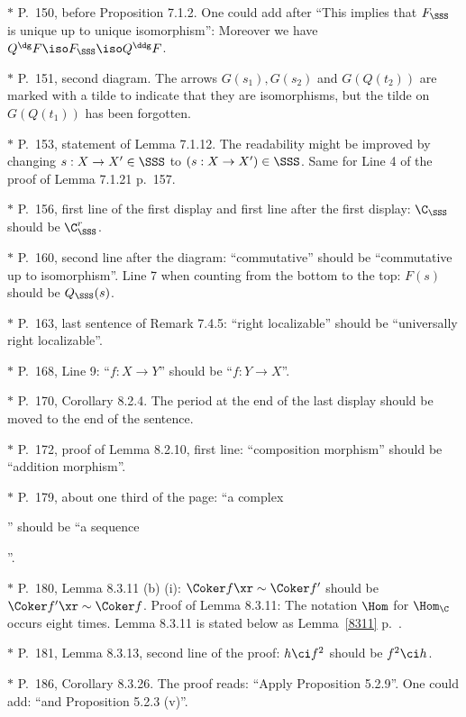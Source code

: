 \documentclass[12pt]{article}
\theoremstyle{remark}
\theoremstyle{definition}
\begin{document}
\nn$*$ P.~150, before Proposition 7.1.2. One could add after ``This implies that $F_{\SSS}$ is unique up to unique isomorphism'': Moreover we have $Q^\dg F\iso F_{\SSS}\iso Q^\ddg F$.

\nn$*$ P.~151, second diagram. The arrows $G(s_1), G(s_2)$ and $G(Q(t_2))$ are marked with a tilde to indicate that they are isomorphisms, but the tilde on $G(Q(t_1))$ has been forgotten.

\nn$*$ P.~153, statement of Lemma 7.1.12. The readability might be improved by changing $s:X\to X'\in\SSS$ to $(s:X\to X')\in\SSS$. Same for Line 4 of the proof of Lemma 7.1.21 p.~157.

\nn$*$ P.~156, first line of the first display and first line after the first display: $\C_\SSS$ should be $\C_\SSS^r$.

\nn$*$ P.~160, second line after the diagram: ``commutative'' should be ``commutative up to isomorphism''. Line 7 when counting from the bottom to the top: $F(s)$ should be $Q_\SSS(s)$.

\nn$*$ P.~163, last sentence of Remark 7.4.5: ``right localizable'' should be ``universally right localizable''.

\nn$*$ P.~168, Line 9: ``$f:X\to Y$'' should be ``$f:Y\to X$''.

\nn$*$ P.~170, Corollary 8.2.4. The period at the end of the last display should be moved to the end of the sentence.

\nn$*$ P.~172, proof of Lemma 8.2.10, first line: ``composition morphism'' should be ``addition morphism''.

\nn$*$ P.~179, about one third of the page: ``a complex 
'' 
should be ``a sequence 
''.

\nn$*$ P.~180, Lemma 8.3.11 (b) (i): $\Coker f\xr\sim\Coker f'$ should be $\Coker f'\xr\sim\Coker f$. Proof of Lemma 8.3.11: The notation $\Hom$ for $\Hom_\C$ occurs eight times. Lemma 8.3.11 is stated below as Lemma~\ref{8311} p.~. 

\nn$*$ P.~181, Lemma 8.3.13, second line of the proof: $h\ci f^2$ should be $f^2\ci h$.

\nn$*$ P.~186, Corollary 8.3.26. The proof reads: ``Apply Proposition 5.2.9''. One could add: ``and Proposition 5.2.3 (v)''.
\end{document}

